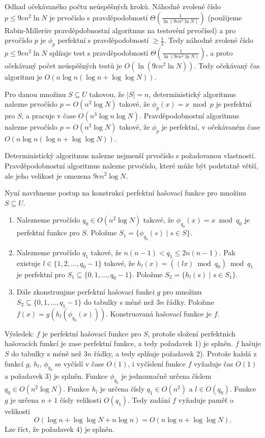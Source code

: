 \documentclass[a4paper,12pt]{article}
\begin{document}
Odhad očekávaného počtu neúspěšných kroků.\newline 
Náhodně zvolené číslo $p\le 9cn^2\ln N$ je prvočíslo s 
pravděpo\-dob\-ností $\Theta (\frac 1{\ln(9cn^2\ln N)})$ 
(použi\-je\-me Rabin-Millerův pravděpdobnostní algoritmus na testovéní prvočísel) a pro prvočíslo $
p$ je $\phi_p$ 
perfektní s prav\-dě\-po\-dob\-ností $\ge\frac 12$. Tedy náhodně zvolené 
číslo $p\le 9cn^2\ln N$ splňuje test s pravdě\-po\-dob\-ností 
$\Theta (\frac 1{\ln(9cn^2\ln N)})$, a proto očeká\-va\-ný počet neúspěšných 
testů je $O(\ln(9cn^2\ln N))$. Tedy očeká\-vaný čas 
algoritmu je $O(n\log n(\log n+\log\log N))$.

\begin{veta}Pro danou množinu $S\subseteq U$ takovou, že 
$|S|=n$, deterministický algoritmus nalezne prvočíslo 
$p=O(n^2\log N)$ takové, že $\phi_p(x)=x\bmod p$ je perfektní 
pro $S$, a pracuje v čase $O(n^3\log n\log N)$. Pravděpodobnostní 
algoritmus nalezne pr\-vočíslo $p=O(n^2\log N)$ takové, že 
$\phi_p$ je perfektní, v očekáva\-ném čase 
$O(n\log n(\log n+\log\log N))$.
\end{veta}

Deterministický algoritmus nalezne nejmenší prvočíslo s 
po\-ža\-dovanou vlastností.  Prav\-dě\-podobnostní algoritmus 
nalezne prvočíslo, které může být podstatně 
větší, ale jeho velikost je omezena $9cn^2\log N$. 

Nyní navrhneme postup na konstrukci perfektní 
hašovací funk\-ce pro množinu $S\subseteq U$.

\begin{enumerate}
\item
Nalezneme prvočíslo $q_0\in O(n^2\log N)$ takové, že 
$\phi_{q_0}(x)=x\bmod q_0$ je perfektní funkce pro $S$. Položme 
$S_1=\{\phi_{q_0}(s)\mid s\in S\}$.
\item
Nalezneme prvočíslo $q_1$ takové, že 
$n(n-1)<q_1\le 2n(n-1)$. Pak existuje 
$l\in \{1,2,\dots,q_0-1\}$ takové, že $h_l(x)=((lx)\bmod q_0
)\bmod q_1$ 
je perfektní pro $S_1\subseteq \{0,1,\dots,q_0-1\}$. Položme 
$S_2=\{h_l(s)\mid s\in S_1\}$.
\item
Dále zkonstruujme perfektní hašovací funkci 
$g$ pro množinu 
$S_2\subseteq \{0,1,\dots,q_1-1\}$ do tabulky s méně než $
3n$ řádky. 
Položme $f(x)=g(h_l(\phi_{q_0}(x)))$. Konstruovaná hašovací 
funkce je $f$.
\end{enumerate}

Výsledek: $f$ je perfektní hašovací funkce pro $
S$, protože 
složení perfektních hašovacích funkcí je zase perfektní 
funkce, a tedy požadavek 1) je splněn. \newline 
$f$ hašuje $S$ do tabulky s méně než $3n$ řádky, a tedy 
splňuje požadavek 2). \newline 
Protože každá z funkcí $g$, $h_l$, $\phi_{q_0}$ se vyčíslí v čase $
O(1)$, 
i vyčíslení funkce $f$ vyžaduje čas $O(1)$ a požadavek 3) je 
splněn.\newline 
Funkce $\phi_{q_0}$ je jednoznačně určena číslem $
q_0\in O(n^2\log N)$. 
Funkce $h_l$ je určena čísly $q_1\in O(n^2)$ a $l\in O(
q_0)$. Funkce $g$ 
je určena $n+1$ čísly velikosti $O(q_1)$. Tedy zadání $
f$ 
vyžaduje paměť o velikosti 
$$O(\log n+\log\log N+n\log n)=O(n\log n+\log\log N).$$
Lze říct, že požadavek 4) je splněn. 
\end{document}
